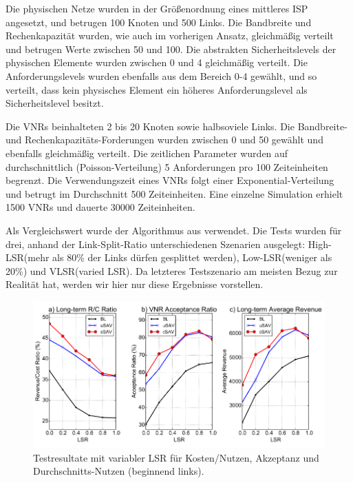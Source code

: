 \documentclass{lni}
\begin{document}
Die physischen Netze wurden in der Größenordnung eines mittleres ISP angesetzt, und betrugen 100 Knoten und 500 Links. Die Bandbreite und Rechenkapazität wurden, wie auch im vorherigen Ansatz, gleichmäßig verteilt und betrugen Werte zwischen 50 und 100. Die abstrakten Sicherheitslevels der physischen Elemente wurden zwischen 0 und 4 gleichmäßig verteilt. Die Anforderungslevels wurden ebenfalls aus dem Bereich 0-4 gewählt, und so verteilt, dass kein physisches Element ein höheres Anforderungslevel als Sicherheitslevel besitzt.

Die VNRs beinhalteten 2 bis 20 Knoten sowie halbsoviele Links. Die Bandbreite- und Rechenkapazitäts-Forderungen wurden zwischen 0 und 50 gewählt und ebenfalls gleichmäßig verteilt.
Die zeitlichen Parameter wurden auf durchschnittlich (Poisson-Verteilung) 5 Anforderungen pro 100 Zeiteinheiten begrenzt. Die Verwendungszeit eines VNRs folgt einer Exponential-Verteilung und betrugt im Durchschnitt 500 Zeiteinheiten. Eine einzelne Simulation erhielt 1500 VNRs und dauerte 30000 Zeiteinheiten. 

Als Vergleichswert wurde der Algorithmus aus \cite{comp} verwendet. Die Tests wurden für drei, anhand der Link-Split-Ratio unterschiedenen Szenarien ausgelegt: 
High-LSR(mehr als 80\% der Links dürfen gesplittet werden),
Low-LSR(weniger als 20\%) und VLSR(varied LSR). Da letzteres Testszenario am meisten Bezug zur Realität hat, werden wir hier nur diese Ergebnisse vorstellen. 

\begin{figure}[htb]
\begin{center}
	\includegraphics[width=1\textwidth]{perf_algo2.pdf}\newline
	\caption{\label{graph12} Testresultate mit variabler LSR für Kosten/Nutzen, Akzeptanz und Durchschnitts-Nutzen (beginnend links). \cite{algo2}}
\end{center}
\end{figure}
\end{document}

